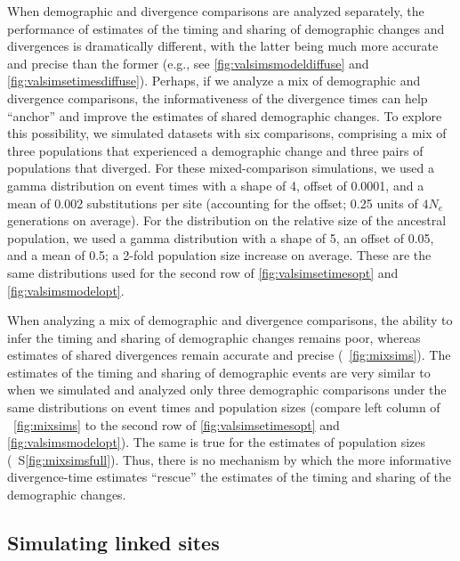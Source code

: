 When demographic and divergence comparisons are analyzed separately, the
performance of estimates of the timing and sharing of demographic changes and
divergences is dramatically different, with the latter being much more accurate
and precise than the former
(e.g., see
\figs
\ref{fig:valsimsmodeldiffuse}
and
\ref{fig:valsimsetimesdiffuse}).
Perhaps, if we analyze a mix of demographic and divergence comparisons,
the informativeness of the divergence times can help ``anchor'' and
improve the estimates of shared demographic changes.
To explore this possibility, we simulated datasets with six comparisons,
comprising a mix of three populations that experienced a demographic change and
three pairs of populations that diverged.
For these mixed-comparison simulations, we used a gamma distribution on event
times with a shape of 4, offset of 0.0001, and a mean of 0.002 substitutions per
site (accounting for the offset; 0.25 units of $4N_e$ generations on average).
For the distribution on the relative size of the ancestral population,
we used a gamma distribution with a shape of 5, an offset of 0.05, and a mean
of 0.5; a 2-fold population size increase on average.
These are the same distributions used for the second row of
\figs
\ref{fig:valsimsetimesopt}
and
\ref{fig:valsimsmodelopt}.

When analyzing a mix of demographic and divergence comparisons, the ability to
infer the timing and sharing of demographic changes remains poor, whereas
estimates of shared divergences remain accurate and precise
(\fig{}~\ref{fig:mixsims}).
The estimates of the timing and sharing of demographic events are very similar
to when we simulated and analyzed only three demographic comparisons under the
same distributions on event times and population sizes
(compare left column of \fig{}~\ref{fig:mixsims}
to the second row of \figs
\ref{fig:valsimsetimesopt}
and
\ref{fig:valsimsmodelopt}).
The same is true for the estimates of population sizes
(\fig{}~S\ref{fig:mixsimsfull}).
Thus, there is no mechanism by which the more informative divergence-time
estimates ``rescue'' the estimates of the timing and sharing of the demographic
changes.

\ifembed{

}{}


\subsection{Simulating linked sites}

